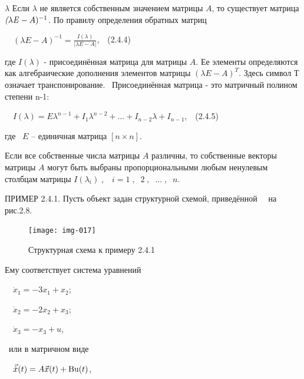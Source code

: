 $ \lambda  $
		Если  $\lambda $ не является собственным значением матрицы  $A$, то существует матрица$\textit(\mathit{\lambda  E}-A)^{-1}$. По
		правилу определения обратных матриц



		\ \  $(\mathit{\lambda  E}-A)^{-1}=\frac{I(\lambda )}{|\mathit{\lambda  E}-A|}$,\ \ (2.4.4)



		где  $I(\lambda )$\textrm{ - }присоединённая матрица для матрицы  $A$. Ее элементы определяются как алгебраические дополнения
		элементов матрицы  $(\mathit{\lambda  E}-A)^T$. Здесь символ Т означает транспонирование. \ Присоединённая матрица - это
		матричный полином степени {n}-1:



		\ \  $I(\lambda )=\mathit{E\lambda }^{n-1}+I_1\lambda ^{n-2}+\ldots +I_{n-2}\lambda +I_{n-1}$,\ \ (2.4.5)



		где \  $E$\textit{ }– единичная матрица  $\left[n\times n\right]$.



		Если все собственные числа матрицы  $A$ различны, то собственные векторы матрицы  $A$ могут быть выбраны
		пропорциональными любым ненулевым столбцам матрицы  $I(\lambda _i)\;,\;\;\;i=1\;,\;\;2\;,\;\;...\;,\;\;n$.



\bigskip


		ПРИМЕР 2.4.1. Пусть объект задан структурной схемой, приведённой \ \ на рис.2.8.



\bigskip
\begin{figure}[h]
	\centering
	\texttt{[image: img-017]}
	\caption {Структурная схема к примеру 2.4.1}
\end{figure}





		Ему соответствует система уравнений



		\ \  $\dot x_1=-3x_1+x_2$;



		\ \  $\dot x_2=-2x_2+x_3$;



		\ \  $\dot x_3=-x_3+u$,



		\ или в матричном виде 



		\ \  $\vec{\dot x}(t)=A\vec x(t)+\normalsubformula{\text{Bu}}(t)$,\ \ 



